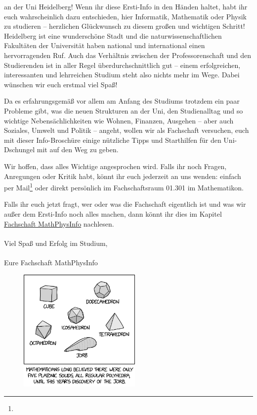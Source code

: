 
an der Uni Heidelberg! Wenn ihr diese Ersti-Info in den Händen haltet, habt ihr euch wahrscheinlich dazu entschieden, hier Informatik, Mathematik oder Physik zu studieren -- herzlichen Glückwunsch zu diesem großen und wichtigen Schritt! Heidelberg ist eine wunderschöne Stadt und die naturwissenschaftlichen Fakultäten der Universität haben national und international einen hervorragenden Ruf. Auch das Verhältnis zwischen der Professorenschaft und den Studierenden ist in aller Regel überdurchschnittlich gut -- einem erfolgreichen, interessanten und lehrreichen Studium steht also nichts mehr im Wege. Dabei wünschen wir euch erstmal viel Spaß! \smiley

Da es erfahrungsgemäß vor allem am Anfang des Studiums trotzdem ein paar Probleme gibt, was die neuen Strukturen an der Uni, den Studienalltag und so wichtige Nebensächlichkeiten wie Wohnen, Finanzen, Ausgehen -- aber auch Soziales, Umwelt und Politik -- angeht, wollen wir als Fachschaft versuchen, euch mit dieser Info-Broschüre einige nützliche Tipps und Starthilfen für den Uni-Dschungel mit auf den Weg zu geben.

\vfill
\eject

Wir hoffen, dass alles Wichtige angesprochen wird. Falls ihr noch Fragen, Anregungen oder Kritik habt, könnt ihr euch jederzeit an uns wenden: einfach per Mail\footnote{} oder direkt persönlich im Fachschaftsraum 01.301 im Mathematikon.

Falls ihr euch jetzt fragt, wer oder was die Fachschaft eigentlich ist und was wir außer dem Ersti-Info noch alles machen, dann könnt ihr dies im Kapitel \hyperref[diefsmathphys]{Fachschaft MathPhysInfo} nachlesen. \\\\

\noindent Viel Spaß und Erfolg im Studium,\\\\

Eure Fachschaft MathPhysInfo


\begin{figure}[b]
\centering
\includegraphics[height=6cm]{bilder/xkcd_platonics.jpg}
\end{figure}
